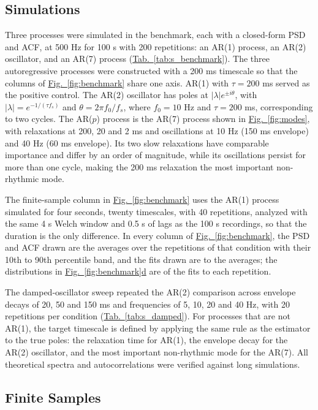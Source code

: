 \documentclass[pdflatex,lineno,sn-nature]{sn-jnl}
\newcommand{\figpanel}[3][]{\hyperref[#2]{Fig.~#1\ref*{#2}#3}}
\newcommand{\tabpanel}[2][]{\hyperref[#2]{Tab.~#1\ref*{#2}}}
\theoremstyle{thmstyleone}
\theoremstyle{thmstyletwo}
\theoremstyle{thmstylethree}
\begin{document}
\subsection{Simulations}

Three processes were simulated in the benchmark, each with a closed-form PSD and ACF, at 500 Hz for 100 s with 200 repetitions: an AR(1) process, an AR(2) oscillator, and an AR(7) process (\tabpanel{tab:s_benchmark}). The three autoregressive processes were constructed with a 200 ms timescale so that the columns of \figpanel{fig:benchmark}{} share one axis. AR(1) with $\tau = 200$ ms served as the positive control. The AR(2) oscillator has poles at $|\lambda| e^{\pm i\theta}$, with $|\lambda| = e^{-1/(\tau f_s)}$ and $\theta = 2\pi f_0/f_s$, where $f_0 = 10$ Hz and $\tau = 200$ ms, corresponding to two cycles. The AR($p$) process is the AR(7) process shown in \figpanel{fig:modes}{}, with relaxations at 200, 20 and 2 ms and oscillations at 10 Hz (150 ms envelope) and 40 Hz (60 ms envelope). Its two slow relaxations have comparable importance and differ by an order of magnitude, while its oscillations persist for more than one cycle, making the 200 ms relaxation the most important non-rhythmic mode.

The finite-sample column in \figpanel{fig:benchmark}{} uses the AR(1) process simulated for four seconds, twenty timescales, with 40 repetitions, analyzed with the same 4 s Welch window and 0.5 s of lags as the 100 s recordings, so that the duration is the only difference. In every column of \figpanel{fig:benchmark}{}, the PSD and ACF drawn are the averages over the repetitions of that condition with their 10th to 90th percentile band, and the fits drawn are to the averages; the distributions in \figpanel{fig:benchmark}{d} are of the fits to each repetition.

The damped-oscillator sweep repeated the AR(2) comparison across envelope decays of 20, 50 and 150 ms and frequencies of 5, 10, 20 and 40 Hz, with 20 repetitions per condition (\tabpanel{tab:s_damped}). For processes that are not AR(1), the target timescale is defined by applying the same rule as the estimator to the true poles: the relaxation time for AR(1), the envelope decay for the AR(2) oscillator, and the most important non-rhythmic mode for the AR(7). All theoretical spectra and autocorrelations were verified against long simulations.

\subsection{Finite Samples}
\end{document}
